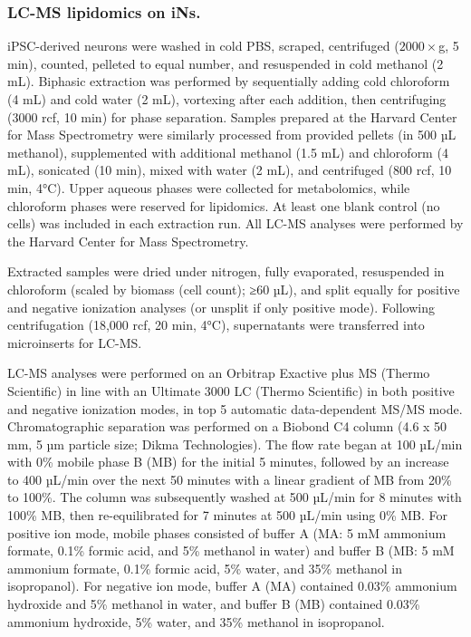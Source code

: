 \subsubsection{LC-MS lipidomics on iNs.}
iPSC-derived neurons were washed in cold PBS, scraped, centrifuged ($2000 \times $g, 5 min), counted, pelleted to equal number, and resuspended in cold methanol (2 mL). Biphasic extraction was performed by sequentially adding cold chloroform (4 mL) and cold water (2 mL), vortexing after each addition, then centrifuging (3000 rcf, 10 min) for phase separation. Samples prepared at the Harvard Center for Mass Spectrometry were similarly processed from provided pellets (in 500 µL methanol), supplemented with additional methanol (1.5 mL) and chloroform (4 mL), sonicated (10 min), mixed with water (2 mL), and centrifuged (800 rcf, 10 min, 4°C). Upper aqueous phases were collected for metabolomics, while chloroform phases were reserved for lipidomics. At least one blank control (no cells) was included in each extraction run. All LC-MS analyses were performed by the Harvard Center for Mass Spectrometry.

Extracted samples were dried under nitrogen, fully evaporated, resuspended in chloroform (scaled by biomass (cell count); ≥60 µL), and split equally for positive and negative ionization analyses (or unsplit if only positive mode). Following centrifugation (18,000 rcf, 20 min, 4°C), supernatants were transferred into microinserts for LC-MS.

LC-MS analyses were performed on an Orbitrap Exactive plus MS (Thermo Scientific) in line with an Ultimate 3000 LC (Thermo Scientific) in both positive and negative ionization modes, in top 5 automatic data-dependent MS/MS mode. Chromatographic separation was performed on a Biobond C4 column (4.6 x 50 mm, 5 µm particle size; Dikma Technologies). The flow rate began at 100 µL/min with 0\% mobile phase B (MB) for the initial 5 minutes, followed by an increase to 400 µL/min over the next 50 minutes with a linear gradient of MB from 20\% to 100\%. The column was subsequently washed at 500 µL/min for 8 minutes with 100\% MB, then re-equilibrated for 7 minutes at 500 µL/min using 0\% MB. For positive ion mode, mobile phases consisted of buffer A (MA: 5 mM ammonium formate, 0.1\% formic acid, and 5\% methanol in water) and buffer B (MB: 5 mM ammonium formate, 0.1\% formic acid, 5\% water, and 35\% methanol in isopropanol). For negative ion mode, buffer A (MA) contained 0.03\% ammonium hydroxide and 5\% methanol in water, and buffer B (MB) contained 0.03\% ammonium hydroxide, 5\% water, and 35\% methanol in isopropanol.

